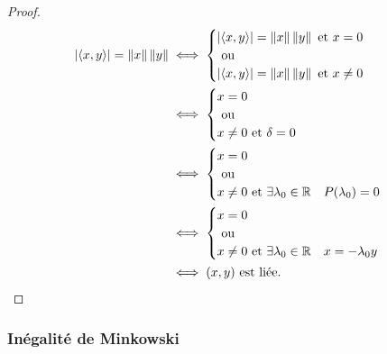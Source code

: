 \begin{proof}
  \begin{align}
    \left\lvert\left\langle{x},{y}\right\rangle\right\rvert=\left\lVert x\right\rVert\left\lVert y\right\rVert &\iff \begin{cases} \left\lvert\left\langle{x},{y}\right\rangle\right\rvert=\left\lVert x\right\rVert\left\lVert y\right\rVert \text{~et~} x=0 \\ \text{~ou~} \\
\left\lvert\left\langle{x},{y}\right\rangle\right\rvert=\left\lVert x\right\rVert\left\lVert y\right\rVert \text{~et~} x\neq 0 \end{cases}\\
&\iff \begin{cases}  x=0 \\ \text{~ou~} \\
 x\neq 0 \text{~et~}  \delta=0\end{cases}\\
&\iff \begin{cases}  x=0 \\ \text{~ou~} \\
 x\neq 0 \text{~et~}  \exists \lambda_0 \in \mathbb{R} \quad P(\lambda_0)=0\end{cases}\\
&\iff \begin{cases}  x=0 \\ \text{~ou~} \\
 x\neq 0 \text{~et~}  \exists \lambda_0 \in \mathbb{R} \quad x=-\lambda_0 y\end{cases}\\
&\iff (x,y) \text{~est liée}.
  \end{align}
\end{proof}

\subsubsection{Inégalité de Minkowski}


